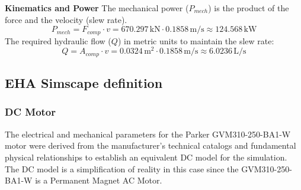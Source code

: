 \documentclass[
bindingoffset=5mm,  %
footnoteindent=3mm, %
hyphenation=true    %
]{src/wut-thesis}
\begin{document}
	\textbf{Kinematics and Power}
	The mechanical power ($P_{mech}$) is the product of the force and the velocity (slew rate). 
	\begin{equation}
		P_{mech} = F_{comp} \cdot v = 670.297\,\text{kN} \cdot 0.1858\,\text{m/s} \approx 124.568\,\text{kW}
	\end{equation}
	The required hydraulic flow ($Q$) in metric units to maintain the slew rate:
	\begin{equation}
		Q = A_{comp} \cdot v = 0.0324\,\text{m}^2 \cdot 0.1858\,\text{m/s} \approx 6.0236\,\text{L/s}
	\end{equation}
	
	\subsection{EHA Simscape definition}
	\label{sec:parameter-derivation}
	
	\subsubsection{DC Motor}
	
	The electrical and mechanical parameters for the Parker GVM310-250-BA1-W motor were derived from the manufacturer's technical catalogs and fundamental physical relationships to establish an equivalent DC model for the simulation. The DC model is a simplification of reality in this case since the GVM310-250-BA1-W is a Permanent Magnet AC Motor.
	
\end{document}
